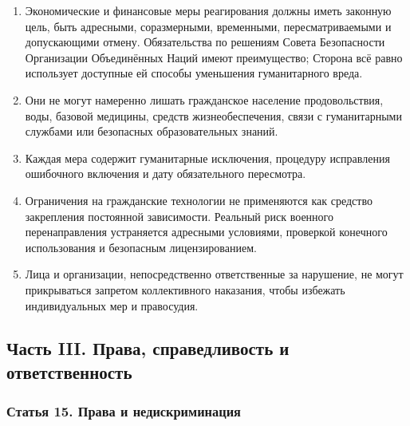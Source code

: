 \documentclass[
  russian,
  11pt,
  a4paper,
]{article}
\providecommand{\tightlist}{%
  \setlength{\itemsep}{0pt}\setlength{\parskip}{0pt}}
\begin{document}
\begin{enumerate}
\def\labelenumi{\arabic{enumi}.}
\tightlist
\item
  Экономические и финансовые меры реагирования должны иметь законную
  цель, быть адресными, соразмерными, временными, пересматриваемыми и
  допускающими отмену. Обязательства по решениям Совета Безопасности
  Организации Объединённых Наций имеют преимущество; Сторона всё равно
  использует доступные ей способы уменьшения гуманитарного вреда.
\item
  Они не могут намеренно лишать гражданское население продовольствия,
  воды, базовой медицины, средств жизнеобеспечения, связи с
  гуманитарными службами или безопасных образовательных знаний.
\item
  Каждая мера содержит гуманитарные исключения, процедуру исправления
  ошибочного включения и дату обязательного пересмотра.
\item
  Ограничения на гражданские технологии не применяются как средство
  закрепления постоянной зависимости. Реальный риск военного
  перенаправления устраняется адресными условиями, проверкой конечного
  использования и безопасным лицензированием.
\item
  Лица и организации, непосредственно ответственные за нарушение, не
  могут прикрываться запретом коллективного наказания, чтобы избежать
  индивидуальных мер и правосудия.
\end{enumerate}

\subsection{Часть III. Права, справедливость и
ответственность}\label{ux447ux430ux441ux442ux44c-iii-ux43fux440ux430ux432ux430-ux441ux43fux440ux430ux432ux435ux434ux43bux438ux432ux43eux441ux442ux44c-ux438-ux43eux442ux432ux435ux442ux441ux442ux432ux435ux43dux43dux43eux441ux442ux44c}

\subsubsection{Статья 15. Права и
недискриминация}\label{ux441ux442ux430ux442ux44cux44f-15-ux43fux440ux430ux432ux430-ux438-ux43dux435ux434ux438ux441ux43aux440ux438ux43cux438ux43dux430ux446ux438ux44f}
\end{document}
